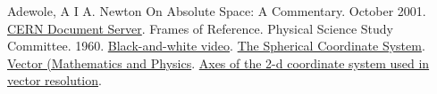 \documentclass[12pt,a4paper]{book}
\newcounter{solution}[chapter] %
\begin{document}
\begin{thebibliography}{00}
     Adewole, A I A. Newton On Absolute Space: A Commentary. October 2001. \href{https://cds.cern.ch/record/523046}{CERN Document Server}.
     Frames of Reference. Physical Science Study Committee. 1960. \href{https://archive.org/details/FramesOfReference_201407}{Black-and-white video}.
     \href{https://en.wikipedia.org/wiki/Spherical_coordinate_system}{The Spherical Coordinate System}.
     \href{https://en.wikipedia.org/wiki/Vector_(mathematics_and_physics)}{Vector (Mathematics and Physics}.
      \href{https://www.physicsforums.com/threads/axes-of-the-2-d-coordinate-system-used-in-vector-resolution.1001481/}{Axes of the 2-d coordinate system used in vector resolution}.
\end{thebibliography}
\end{document}
